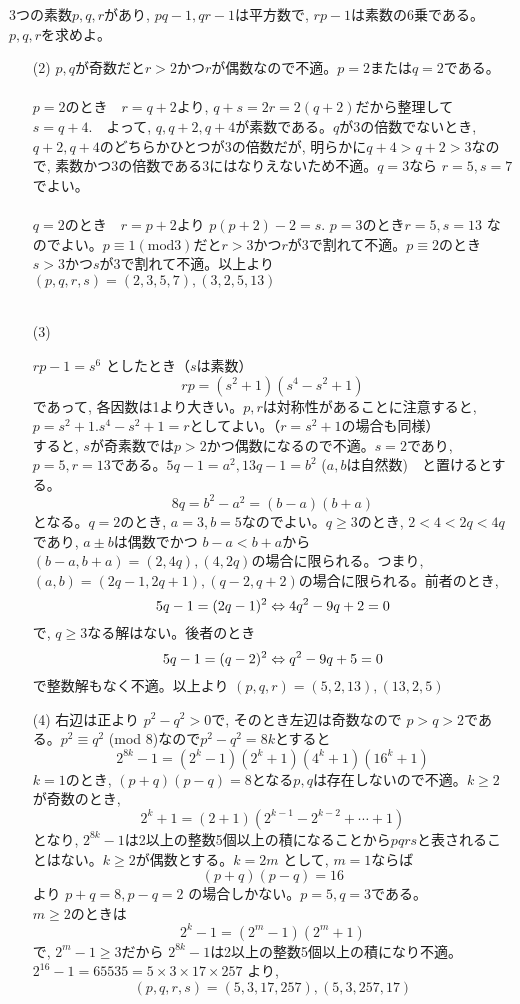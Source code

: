 3つの素数$p,q,r$があり, $pq-1, qr-1$は平方数で, $rp-1$は素数の6乗である。$p,q,r$を求めよ。
\enthm
\begin{enumerate}
\item[(2)] $p,q$が奇数だと$r>2$かつ$r$が偶数なので不適。$p=2$または$q=2$である。\\
\\
$p=2$のとき　$r=q+2$より, $q+s=2r=2(q+2)$だから整理して $s=q+4$.　よって, $q,q+2,q+4$が素数である。$q$が3の倍数でないとき, $q+2, q+4$のどちらかひとつが3の倍数だが, 明らかに$q+4>q+2>3$なので, 素数かつ3の倍数である3にはなりえないため不適。$q=3$なら $r=5, s=7$でよい。\\
\\
$q=2$のとき　$r=p+2$より $p(p+2)-2=s$. $p=3$のとき$r=5, s=13$ なのでよい。$p\equiv 1 　(\mbox{mod} 3)$だと$r>3$かつ$r$が3で割れて不適。$p\equiv 2$のとき$s>3$かつ$s$が3で割れて不適。以上より $(p,q,r,s)=(2,3,5,7), (3,2,5,13)$\\
\\
\item[(3)] 

$rp-1=s^6$ としたとき（$s$は素数）
\[rp=(s^2+1)(s^4-s^2+1)\]
であって, 各因数は1より大きい。$p,r$は対称性があることに注意すると, $p=s^2+1. s^4-s^2+1=r$としてよい。（$r=s^2+1$の場合も同様）\\
すると, $s$が奇素数では$p>2$かつ偶数になるので不適。$s=2$であり, $p=5, r=13$である。$5q-1=a^2, 13q-1=b^2$ ($a,b$は自然数)　と置けるとする。
\[8q=b^2-a^2=(b-a)(b+a)\]
となる。$q=2$のとき, $a=3, b=5$なのでよい。$q\geq 3$のとき, $2<4<2q<4q$であり, $a\pm b$は偶数でかつ $b-a<b+a$から $(b-a,b+a)=(2, 4q), (4,2q)$の場合に限られる。つまり, $(a,b)=(2q-1, 2q+1), (q-2, q+2)$の場合に限られる。前者のとき,
\[5q-1=(2q-1)^2 \Leftrightarrow 4q^2-9q+2=0\]
で, $q\geq 3$なる解はない。後者のとき
\[5q-1=(q-2)^2 \Leftrightarrow q^2-9q+5=0\]
で整数解もなく不適。以上より $(p,q,r)=(5,2,13), (13,2,5)$
\item[(4)] 右辺は正より $p^2-q^2>0$で, そのとき左辺は奇数なので $p>q>2$である。$p^2\equiv q^2$ (mod $8$)なので$p^2-q^2=8k$とすると
\[2^{8k}-1=(2^k-1)(2^k+1)(4^k+1)(16^k+1)\]
$k=1$のとき, $(p+q)(p-q)=8$となる$p,q$は存在しないので不適。$k\geq 2$が奇数のとき, 
\[2^k+1=(2+1)(2^{k-1}-2^{k-2}+\cdots +1)\]
となり, $2^{8k}-1$は2以上の整数5個以上の積になることから$pqrs$と表されることはない。$k\geq 2$が偶数とする。$k=2m$ として, $m=1$ならば 
\[(p+q)(p-q)=16\]
より $p+q=8, p-q=2$ の場合しかない。$p=5, q=3$である。\\
$m\geq 2$のときは
\[2^{k}-1=(2^m-1)(2^m+1)\]
で, $2^{m}-1\geq 3$だから $2^{8k}-1$は2以上の整数5個以上の積になり不適。\\
$2^{16}-1=65535=5\times 3\times 17\times 257$ より,
\[(p,q,r,s)=(5,3,17,257), (5,3,257,17)\]



\end{enumerate}
